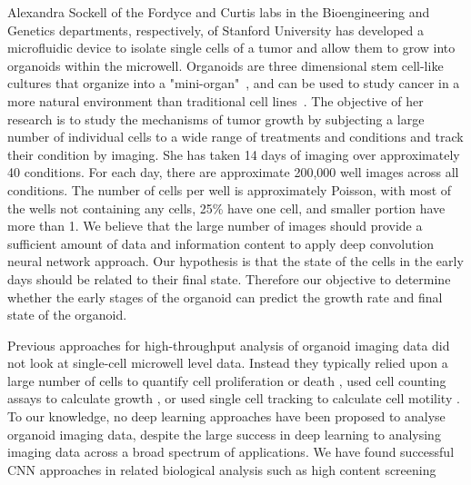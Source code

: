 \documentclass[10pt,twocolumn,letterpaper]{article}
\begin{document}
Alexandra Sockell of the Fordyce and Curtis labs in the Bioengineering and Genetics departments, respectively, of Stanford University has developed a microfluidic device to isolate single cells of a tumor and allow them to grow into organoids  within the microwell.  Organoids are three dimensional stem cell-like cultures that organize into a "mini-organ"~\cite{rios2018imaging}, and can be used to study cancer in a more natural environment than traditional cell lines~\cite{drost2018organoids}.
The objective of her research is to study the mechanisms of tumor growth by subjecting a large number of  individual cells to a wide range of treatments and conditions and track their condition by imaging.  She has taken 14 days of imaging over approximately 40 conditions.    For each day, there are approximate 200,000 well images across all conditions.  The number of cells per well is approximately Poisson, with most of the wells not containing any cells, 25\% have one cell, and smaller portion have more than 1.  We believe that the large number of images should provide a sufficient amount of data and information content to apply deep convolution neural network approach.  Our hypothesis is that the state of the cells in the early days should be related to their final state.  Therefore our objective to determine whether the early stages of the organoid can predict the growth rate and final state of the organoid.    



Previous approaches for high-throughput analysis of organoid imaging data did not look at single-cell microwell level data.  Instead they typically relied upon a large number of cells to quantify cell proliferation or death \cite{jabs2017screening},  used cell counting assays to calculate growth \cite{sebrell2018live}, or used single cell tracking to calculate cell motility \cite{geum2016epidermal}.  To our knowledge, no deep learning approaches have been proposed to analyse organoid imaging data, despite the large success in deep learning to analysing imaging data across a broad spectrum of applications.  We have found successful CNN approaches in related biological analysis such as high content screening \cite{simm2018repurposing}
\end{document}
